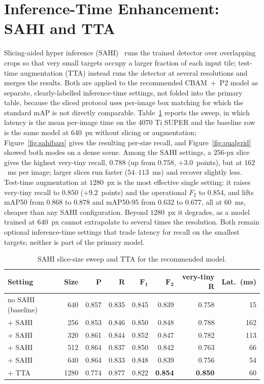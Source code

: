 \section{Inference-Time Enhancement: SAHI and TTA}
\label{sec:sahitta}
Slicing-aided hyper inference (SAHI)~\cite{akyon2022sahi} runs the trained detector
over overlapping crops so that very small targets occupy a larger fraction of each
input tile; test-time augmentation (TTA) instead runs the detector at several
resolutions and merges the results. Both are applied to the recommended CBAM~+~P2
model as separate, clearly-labelled inference-time settings, not folded into the
primary table, because the sliced protocol uses per-image box matching for which the
standard mAP is not directly comparable. Table~\ref{tab:sahi} reports the sweep, in which latency is the mean
per-image time on the 4070 Ti SUPER and the baseline row is the same model
at 640~px without slicing or augmentation; Figure~\ref{fig:sahibars} gives
the resulting per-size recall, and Figure~\ref{fig:qualgrid} showed both
modes on a dense scene. Among the SAHI
settings, a $256$-px slice gives the highest very-tiny recall, $0.788$ (up from
$0.758$, $+3.0$~points), but at $162$~ms per image; larger slices run faster
($54$--$113$~ms) and recover slightly less. Test-time augmentation at $1280$~px is
the most effective single setting: it raises very-tiny recall to $0.850$
($+9.2$~points) and the operational $F_2$ to $0.854$, and lifts mAP50 from $0.868$
to $0.878$ and mAP50-95 from $0.632$ to $0.677$, all at $60$~ms, cheaper than any
SAHI configuration. Beyond $1280$~px it degrades, as a model trained at $640$~px
cannot extrapolate to several times the resolution. Both remain optional
inference-time settings that trade latency for recall on the smallest targets;
neither is part of the primary model.

\begin{table}[H]
  \centering
  \caption{SAHI slice-size sweep and TTA for the recommended model.}
  \label{tab:sahi}
  \setlength{\tabcolsep}{4pt}
  \begin{tabular}{@{}l r r r r r r r@{}}
    \toprule
    \textbf{Setting} & \textbf{Size} & \textbf{$\symbf{P}$} & \textbf{$\symbf{R}$} & \textbf{$\symbf{F_1}$} & \textbf{$\symbf{F_2}$} & \textbf{very-tiny R} & \textbf{Lat.\ (ms)} \\
    \midrule
    no SAHI (baseline) & 640  & 0.857 & 0.835 & 0.845 & 0.839 & 0.758 & 15 \\
    + SAHI             & 256  & 0.853 & 0.846 & 0.850 & 0.848 & 0.788 & 162 \\
    + SAHI             & 320  & 0.861 & 0.844 & 0.852 & 0.847 & 0.782 & 113 \\
    + SAHI             & 512  & 0.864 & 0.837 & 0.850 & 0.842 & 0.763 & 66 \\
    + SAHI             & 640  & 0.864 & 0.833 & 0.848 & 0.839 & 0.756 & 54 \\
    + TTA              & 1280 & 0.774 & 0.877 & 0.822 & \textbf{0.854} & \textbf{0.850} & 60 \\
    \bottomrule
  \end{tabular}
\end{table}

